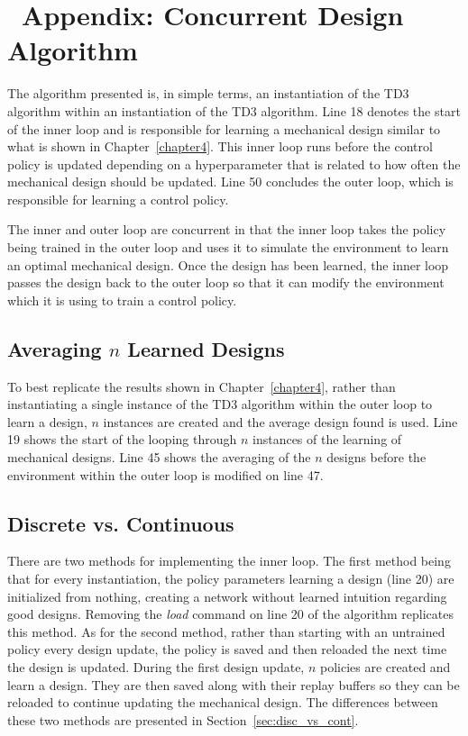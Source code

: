 \chapter{~Appendix: Concurrent Design Algorithm}
\label{app:concurrent_des_algo}
The algorithm presented is, in simple terms, an instantiation of the TD3 algorithm within an instantiation of the TD3 algorithm. Line 18 denotes the start of the inner loop and is responsible for learning a mechanical design similar to what is shown in Chapter~\ref{chapter4}. This inner loop runs before the control policy is updated depending on a hyperparameter that is related to how often the mechanical design should be updated. Line 50 concludes the outer loop, which is responsible for learning a control policy. 

The inner and outer loop are concurrent in that the inner loop takes the policy being trained in the outer loop and uses it to simulate the environment to learn an optimal mechanical design. Once the design has been learned, the inner loop passes the design back to the outer loop so that it can modify the environment which it is using to train a control policy. 

\section{Averaging $n$ Learned Designs}
To best replicate the results shown in Chapter~\ref{chapter4}, rather than instantiating a single instance of the TD3 algorithm within the outer loop to learn a design, $n$ instances are created and the average design found is used. Line 19 shows the start of the looping through $n$ instances of the learning of mechanical designs. Line 45 shows the averaging of the $n$ designs before the environment within the outer loop is modified on line 47. 

\section{Discrete vs. Continuous}
There are two methods for implementing the inner loop. The first method being that for every instantiation, the policy parameters learning a design (line 20) are initialized from nothing, creating a network without learned intuition regarding good designs. Removing the \textit{load} command on line 20 of the algorithm replicates this method. As for the second method, rather than starting with an untrained policy every design update, the policy is saved and then reloaded the next time the design is updated. During the first design update, $n$ policies are created and learn a design. They are then saved along with their replay buffers so they can be reloaded to continue updating the mechanical design. The differences between these two methods are presented in Section~\ref{sec:disc_vs_cont}.

